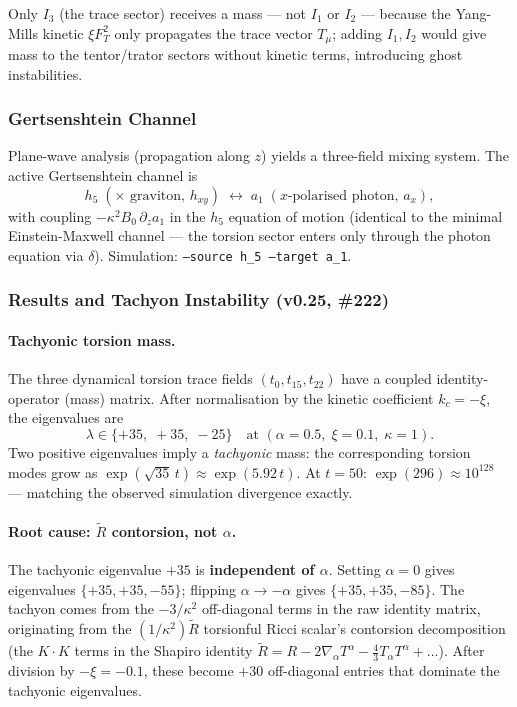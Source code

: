 Only $I_3$ (the trace sector) receives a mass --- not $I_1$ or $I_2$ --- because the
Yang-Mills kinetic $\xi F_T^2$ only propagates the trace vector $T_\mu$; adding
$I_1, I_2$ would give mass to the tentor/trator sectors without kinetic terms,
introducing ghost instabilities.

\subsubsection{Gertsenshtein Channel}

Plane-wave analysis (propagation along $z$) yields a three-field mixing system.
The active Gertsenshtein channel is
\begin{equation}
  h_5\;(\text{$\times$ graviton, $h_{xy}$})
  \;\longleftrightarrow\;
  a_1\;(\text{$x$-polarised photon, $a_x$}),
\end{equation}
with coupling $-\kappa^2 B_0\, \partial_z a_1$ in the $h_5$ equation of motion
(identical to the minimal Einstein-Maxwell channel --- the torsion sector enters only
through the photon equation via $\delta$).
Simulation: \texttt{--source h\_5 --target a\_1}.

\subsubsection{Results and Tachyon Instability (v0.25, \#222)}

\paragraph{Tachyonic torsion mass.}
The three dynamical torsion trace fields $(t_0, t_{15}, t_{22})$ have a coupled
identity-operator (mass) matrix.  After normalisation by the kinetic coefficient
$k_c = -\xi$, the eigenvalues are
\[
  \lambda \in \{+35,\; +35,\; -25\}
  \quad\text{at } (\alpha=0.5,\; \xi=0.1,\; \kappa=1).
\]
Two positive eigenvalues imply a \emph{tachyonic} mass: the corresponding torsion
modes grow as $\exp(\sqrt{35}\,t) \approx \exp(5.92\,t)$.
At $t = 50$: $\exp(296) \approx 10^{128}$ --- matching the observed simulation
divergence exactly.

\paragraph{Root cause: $\widetilde R$ contorsion, not $\alpha$.}
The tachyonic eigenvalue $+35$ is \textbf{independent of $\alpha$}.
Setting $\alpha = 0$ gives eigenvalues $\{+35, +35, -55\}$; flipping $\alpha \to -\alpha$
gives $\{+35, +35, -85\}$.  The tachyon comes from the $-3/\kappa^2$ off-diagonal
terms in the raw identity matrix, originating from the $(1/\kappa^2)\widetilde R$
torsionful Ricci scalar's contorsion decomposition (the $K \cdot K$ terms in the
Shapiro identity $\widetilde R = R - 2\nabla_\alpha T^\alpha - \tfrac{4}{3}T_\alpha T^\alpha
+ \ldots$).  After division by $-\xi = -0.1$, these become $+30$ off-diagonal entries
that dominate the tachyonic eigenvalues.

